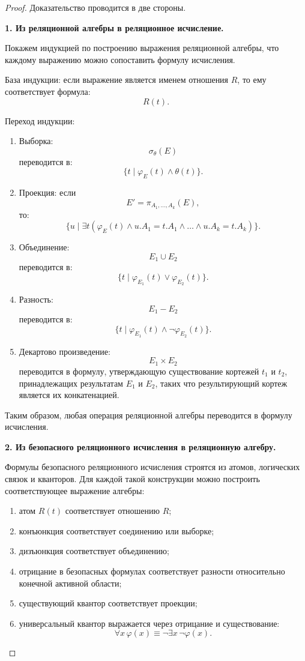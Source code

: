\documentclass[12pt,a4paper]{article}
\theoremstyle{remark}
\begin{document}
\begin{proof}
Доказательство проводится в две стороны.

\textbf{1. Из реляционной алгебры в реляционное исчисление.}

Покажем индукцией по построению выражения реляционной алгебры, что каждому выражению можно сопоставить формулу исчисления.

База индукции: если выражение является именем отношения $R$, то ему соответствует формула:
\[
R(t).
\]

Переход индукции:
\begin{enumerate}
    \item Выборка:
    \[
    \sigma_\theta(E)
    \]
    переводится в:
    \[
    \{t \mid \varphi_E(t) \wedge \theta(t)\}.
    \]

    \item Проекция:
    если
    \[
    E' = \pi_{A_1,\dots,A_k}(E),
    \]
    то:
    \[
    \{u \mid \exists t(\varphi_E(t)
    \wedge u.A_1=t.A_1 \wedge \dots \wedge u.A_k=t.A_k)\}.
    \]

    \item Объединение:
    \[
    E_1 \cup E_2
    \]
    переводится в:
    \[
    \{t \mid \varphi_{E_1}(t) \vee \varphi_{E_2}(t)\}.
    \]

    \item Разность:
    \[
    E_1 - E_2
    \]
    переводится в:
    \[
    \{t \mid \varphi_{E_1}(t) \wedge \neg \varphi_{E_2}(t)\}.
    \]

    \item Декартово произведение:
    \[
    E_1 \times E_2
    \]
    переводится в формулу, утверждающую существование кортежей $t_1$ и $t_2$, принадлежащих результатам $E_1$ и $E_2$, таких что результирующий кортеж является их конкатенацией.
\end{enumerate}

Таким образом, любая операция реляционной алгебры переводится в формулу исчисления.

\textbf{2. Из безопасного реляционного исчисления в реляционную алгебру.}

Формулы безопасного реляционного исчисления строятся из атомов, логических связок и кванторов. Для каждой такой конструкции можно построить соответствующее выражение алгебры:
\begin{enumerate}
    \item атом $R(t)$ соответствует отношению $R$;
    \item конъюнкция соответствует соединению или выборке;
    \item дизъюнкция соответствует объединению;
    \item отрицание в безопасных формулах соответствует разности относительно конечной активной области;
    \item существующий квантор соответствует проекции;
    \item универсальный квантор выражается через отрицание и существование:
    \[
    \forall x\,\varphi(x) \equiv \neg \exists x\, \neg \varphi(x).
    \]
\end{enumerate}


\end{proof}
\end{document}
